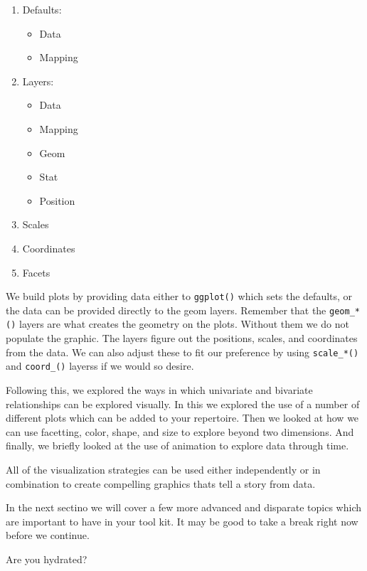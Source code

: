 \documentclass[
]{book}
\providecommand{\tightlist}{%
  \setlength{\itemsep}{0pt}\setlength{\parskip}{0pt}}
\begin{document}
\begin{enumerate}
\def\labelenumi{\arabic{enumi}.}
\tightlist
\item
  Defaults:

  \begin{itemize}
  \tightlist
  \item
    Data
  \item
    Mapping
  \end{itemize}
\item
  Layers:

  \begin{itemize}
  \tightlist
  \item
    Data
  \item
    Mapping
  \item
    Geom
  \item
    Stat
  \item
    Position
  \end{itemize}
\item
  Scales
\item
  Coordinates
\item
  Facets
\end{enumerate}

We build plots by providing data either to \texttt{ggplot()} which sets the defaults, or the data can be provided directly to the geom layers. Remember that the \texttt{geom\_*()} layers are what creates the geometry on the plots. Without them we do not populate the graphic. The layers figure out the positions, scales, and coordinates from the data. We can also adjust these to fit our preference by using \texttt{scale\_*()} and \texttt{coord\_()} layerss if we would so desire.

Following this, we explored the ways in which univariate and bivariate relationships can be explored visually. In this we explored the use of a number of different plots which can be added to your repertoire. Then we looked at how we can use facetting, color, shape, and size to explore beyond two dimensions. And finally, we briefly looked at the use of animation to explore data through time.

All of the visualization strategies can be used either independently or in combination to create compelling graphics thats tell a story from data.

In the next sectino we will cover a few more advanced and disparate topics which are important to have in your tool kit. It may be good to take a break right now before we continue.

Are you hydrated?
\end{document}
